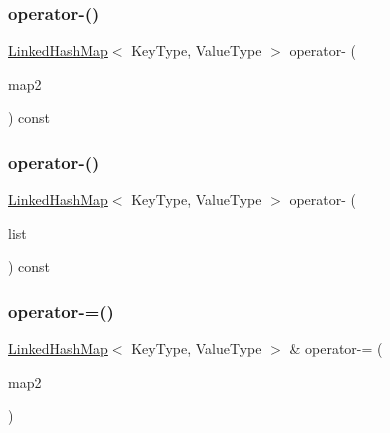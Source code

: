 \mbox{\label{classLinkedHashMap_aeb0ad54e8008a28ea0578ba8825a6e77}} 
\subsubsection{\texorpdfstring{operator-\/()}{operator-()}\hspace{0.1cm}{\footnotesize\ttfamily [1/2]}}
{\footnotesize\ttfamily \mbox{\hyperlink{classLinkedHashMap}{Linked\+Hash\+Map}}$<$ Key\+Type, Value\+Type $>$ operator-\/ (\begin{DoxyParamCaption}\item[{const \mbox{\hyperlink{classLinkedHashMap}{Linked\+Hash\+Map}}$<$ Key\+Type, Value\+Type $>$ \&}]{map2 }\end{DoxyParamCaption}) const}

\mbox{\label{classLinkedHashMap_a37609d0fc11658bfbe010c4f7c39c4b2}} 
\subsubsection{\texorpdfstring{operator-\/()}{operator-()}\hspace{0.1cm}{\footnotesize\ttfamily [2/2]}}
{\footnotesize\ttfamily \mbox{\hyperlink{classLinkedHashMap}{Linked\+Hash\+Map}}$<$ Key\+Type, Value\+Type $>$ operator-\/ (\begin{DoxyParamCaption}\item[{std\+::initializer\+\_\+list$<$ std\+::pair$<$ Key\+Type, Value\+Type $>$ $>$}]{list }\end{DoxyParamCaption}) const}

\mbox{\label{classLinkedHashMap_af9f41a756eeffcfbb82c0801ddd1bb71}} 
\subsubsection{\texorpdfstring{operator-\/=()}{operator-=()}\hspace{0.1cm}{\footnotesize\ttfamily [1/2]}}
{\footnotesize\ttfamily \mbox{\hyperlink{classLinkedHashMap}{Linked\+Hash\+Map}}$<$ Key\+Type, Value\+Type $>$ \& operator-\/= (\begin{DoxyParamCaption}\item[{const \mbox{\hyperlink{classLinkedHashMap}{Linked\+Hash\+Map}}$<$ Key\+Type, Value\+Type $>$ \&}]{map2 }\end{DoxyParamCaption})}

